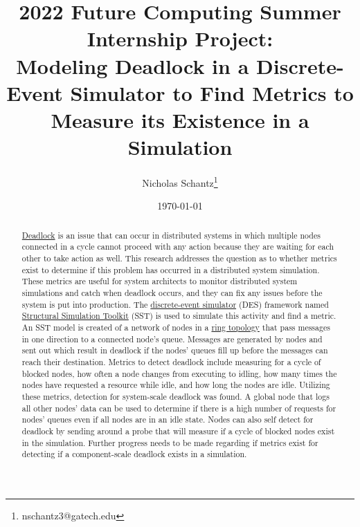 \documentclass{article}
\begin{document}
%
%
%

        \title{2022 Future Computing Summer Internship Project:\\Modeling Deadlock in a Discrete-Event Simulator to Find Metrics to Measure its Existence in a Simulation}
        \author{Nicholas Schantz\thanks{nschantz3@gatech.edu}}
        \date{\today}
            \maketitle
        \begin{abstract}
            \href{https://en.wikipedia.org/wiki/Deadlock}{Deadlock} is an issue that can occur in distributed systems in which multiple nodes connected in a cycle cannot proceed with any action because they are waiting for each other to take action as well. This research addresses the question as to whether metrics exist to determine if this problem has occurred in a distributed system simulation. These metrics are useful for system architects to monitor distributed system simulations and catch when deadlock occurs, and they can fix any issues before the system is put into production. The \href{https://en.wikipedia.org/wiki/Discrete-event_simulation}{discrete-event simulator} (DES) framework named \href{http://sst-simulator.org/}{Structural Simulation Toolkit} (SST) is used to simulate this activity and find a metric. An SST model is created of a network of nodes in a \href{https://en.wikipedia.org/wiki/Ring_network}{ring topology} that pass messages in one direction to a connected node's queue. Messages are generated by nodes and sent out which result in deadlock if the nodes' queues fill up before the messages can reach their destination. Metrics to detect deadlock include measuring for a cycle of blocked nodes, how often a node changes from executing to idling, how many times the nodes have requested a resource while idle, and how long the nodes are idle. Utilizing these metrics, detection for system-scale deadlock was found. A global node that logs all other nodes' data can be used to determine if there is a high number of requests for nodes' queues even if all nodes are in an idle state. Nodes can also self detect for deadlock by sending around a probe that will measure if a cycle of blocked nodes exist in the simulation. Further progress needs to be made regarding if metrics exist for detecting if a component-scale deadlock exists in a simulation.
        \end{abstract}
\end{document}
